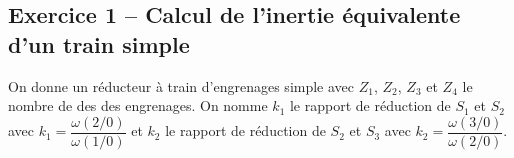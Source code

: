 \documentclass[10pt,fleqn]{article} %
\begin{document}
\def\pathfig{images}

\vspace{4.5cm}
\pagestyle{fancy}
\thispagestyle{plain}

\def\columnseprulecolor{\color{ocre}}
\setlength{\columnseprule}{0.4pt} 

\def\pathfig{images}

\ifprof
\else
\begin{multicols}{2}
\fi


\section*{Exercice 1 -- Calcul de l'inertie équivalente d'un train simple}
\setcounter{subparagraph}{0}
On donne un réducteur à train d'engrenages simple avec $Z_1$, $Z_2$, $Z_3$ et $Z_4$ le nombre de des des engrenages. On nomme $k_1$ le rapport de réduction de $S_1$ et $S_2$ avec $k_1=\dfrac{\omega(2/0)}{\omega(1/0)}$ et  
$k_2$ le rapport de réduction de $S_2$ et $S_3$ avec $k_2=\dfrac{\omega(3/0)}{\omega(2/0)}$. 


\end{multicols}
\end{document}
